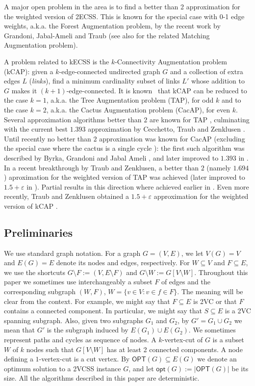 \documentclass{article}
\newcommand{\eps}{\varepsilon}
\newcommand{\OPT}{\mathsf{OPT}}
\newcommand{\opt}{\mathsf{opt}}
\begin{document}
A major open problem in the area is to find a better than 2 approximation for the weighted version of 2ECSS. This is known for the special case with 0-1 edge weights, a.k.a. the Forest Augmentation problem, by the recent work by Grandoni, Jabal-Ameli and Traub \cite{GJT22} (see also \cite{BDS22,CDGKN20,CCDZ20} for the related Matching Augmentation problem). 


A problem related to kECSS is the $k$-Connectivity Augmentation problem (kCAP): given a $k$-edge-connected undirected graph $G$ and a collection of extra edges $L$ (\emph{links}), find a minimum cardinality subset of links $L'$ whose addition to $G$ makes it $(k+1)$-edge-connected. It is known~\cite{DKL76} that kCAP can be reduced to the case $k=1$, a.k.a. the Tree Augmentation problem (TAP), for odd $k$ and to the case $k=2$, a.k.a. the Cactus Augmentation problem (CacAP), for even $k$. Several approximation algorithms better than $2$ are known for TAP \cite{A17,CG18,CG18a,EFKN09,FGKS18,GKZ18,KN16,KN16b,N03}, culminating with the current best $1.393$ approximation by Cecchetto, Traub and Zenklusen \cite{CTZ21}. Until recently no better than $2$ approximation was known for CacAP (excluding the special case where the cactus is a single cycle \cite{GGJS19}): the first such algorithm was described by Byrka, Grandoni and Jabal Ameli \cite{BGJ20}, and later improved to $1.393$ in \cite{CTZ21}. In a recent breakthrough by Traub and Zenklusen, a better than $2$ (namely $1.694$) aproximation for the weighted version of TAP was achieved \cite{TZ21} (later improved to $1.5+\eps$ in \cite{TZ23}). Partial results in this direction where achieved earlier in \cite{A17,CN13,FGKS18,GKZ18,N17}. Even more recently, Traub and Zenklusen obtained a $1.5+\eps$ approximation for the weighted version of kCAP \cite{TZ23}.

\subsection{Preliminaries}\label{sec:preliminaries}

We use standard graph notation. For a graph $G=(V,E)$, we  let $V(G)=V$ and $E(G)=E$ denote its nodes and edges, respectively. For $W\subseteq V$ and $F\subseteq E$, we use the shortcuts $G\setminus F:=(V,E\setminus F)$ and $G\setminus W:=G[V\setminus W]$. Throughout this paper we sometimes use interchangeably a subset $F$ of edges and the corresponding subgraph $(W,F)$, $W=\{v\in V: v\in f\in F\}$. The meaning will be clear from the context. For example, we might say that $F\subseteq E$ is 2VC or that $F$ contains a connected component. In particular, we might say that $S\subseteq E$ is a 2VC spanning subgraph. Also, given two subgraphs $G_1$ and $G_2$, by $G'=G_1\cup G_2$ we mean that $G'$ is the subgraph induced by $E(G_1)\cup E(G_2)$. We sometimes represent paths and cycles as sequence of nodes. A $k$-vertex-cut of $G$ is a subset $W$ of $k$ nodes such that $G[V\setminus W]$ has at least 2 connected components. A node defining a $1$-vertex-cut is a cut vertex. By $\OPT(G)\subseteq E(G)$ we denote an optimum solution to a 2VCSS instance $G$, and let $\opt(G):=|\OPT(G)|$ be its size. All the algorithms described in this paper are deterministic.
\end{document}
